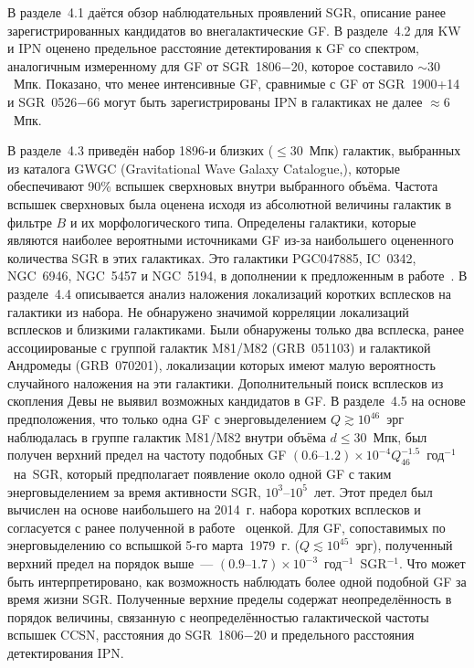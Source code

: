 В разделе~4.1 даётся обзор наблюдательных проявлений SGR, описание ранее зарегистрированных 
кандидатов во внегалактические GF. В разделе~4.2 для KW и IPN оценено предельное 
расстояние детектирования к GF со спектром, аналогичным измеренному для GF от SGR~1806$-$20, 
которое составило $\sim 30$~Мпк. Показано, что менее интенсивные GF, сравнимые 
с GF от SGR~1900+14 и SGR~0526$-$66 могут быть зарегистрированы IPN в галактиках 
не далее $\approx 6$~Мпк.

В разделе~4.3 приведён набор 1896-и близких ($\le 30$~Мпк) галактик, 
выбранных из каталога GWGC (Gravitational Wave Galaxy Catalogue,\citep{White2011CQGra}),
которые обеспечивают 90\% вспышек сверхновых внутри выбранного объёма.
Частота вспышек сверхновых была оценена исходя из абсолютной величины галактик 
в фильтре $B$ и их морфологического типа. 
Определены галактики, которые являются наиболее вероятными источниками GF 
из-за наибольшего оцененного количества SGR в этих галактиках. Это галактики
PGC047885, IC~0342, NGC~6946, NGC~5457 и NGC~5194, в дополнении к предложенным 
в работе~\citep{Popov2006}.
В разделе~4.4 описывается анализ наложения 
локализаций коротких всплесков на галактики из набора. Не обнаружено значимой 
корреляции локализаций всплесков и близкими галактиками. Были обнаружены только два всплеска, ранее 
ассоциированые с группой галактик M81/M82 (GRB~051103) и галактикой Андромеды (GRB~070201),
локализации которых имеют малую вероятность случайного наложения на эти галактики.
Дополнительный поиск всплесков из скопления Девы не выявил возможных кандидатов в GF.
В разделе~4.5 на основе предположения, что только одна GF с энерговыделением 
$Q \gtrsim 10^{46}$~эрг наблюдалась в группе галактик M81/M82 внутри объёма $d \le 30$~Мпк, 
был получен верхний предел на частоту подобных GF 
${(0.6\textrm{--}1.2)\times 10^{-4} Q_{46}^{-1.5}}$~год$^{-1}$~на~SGR, который предполагает 
появление около одной GF с таким энерговыделением за время активности SGR, $10^3\textrm{--}10^5$~лет. 
Этот предел был вычислен на основе наибольшего на 2014~г.  
набора коротких всплесков и согласуется с ранее полученной в работе~\citep{Ofek_2007ApJ} оценкой. 
Для GF, сопоставимых по энерговыделению со вспышкой 5-го марта~1979~г. ($Q \lesssim 10^{45}$~эрг), 
полученный верхний предел на порядок выше~--- $(0.9\textrm{--}1.7)\times 10^{-3}$~год$^{-1}$~SGR$^{-1}$. 
Что может быть интерпретировано, как возможность наблюдать более одной подобной GF за время жизни SGR.
Полученные верхние пределы содержат неопределённость в порядок величины, связанную с
неопределённостью галактической частоты вспышек CCSN, расстояния до SGR~1806$-$20 и
предельного расстояния детектирования IPN.

